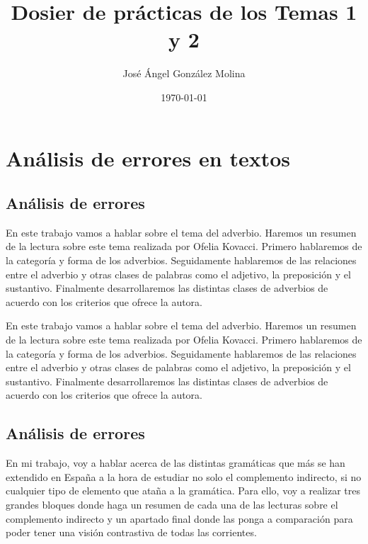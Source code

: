 \documentclass[12pt, a4paper, oneside]{report}
\title{Dosier de prácticas de los Temas 1 y 2}
\author{José Ángel González Molina}
\date{\today}
\begin{document}
    \color{negro}
    \maketitle
    \clearpage

    \chapter*{Análisis de errores en textos}
    \setcounter{chapter}{1}
      \section{Análisis de errores}
      En este trabajo vamos a hablar sobre el tema del adverbio. Haremos un resumen de la lectura sobre este
      tema realizada por Ofelia Kovacci. Primero hablaremos de la categoría y forma de los adverbios.
      Seguidamente hablaremos de las relaciones entre el adverbio y otras clases de palabras como el adjetivo,
      la preposición y el sustantivo. Finalmente desarrollaremos las distintas clases de adverbios de acuerdo
      con los criterios que ofrece la autora.



    En este trabajo vamos a hablar %
     sobre el tema del adverbio. Haremos un resumen %
de la lectura sobre este tema realizada por
Ofelia Kovacci. Primero hablaremos de la %
categoría y forma de los adverbios.
Seguidamente %
hablaremos %
de
las
relaciones entre el adverbio y otras clases
de
palabras
como
el
adjetivo,
la
preposición y el sustantivo. Finalmente %
desarrollaremos las distintas clases de
adverbios de acuerdo con los criterios que
ofrece la autora.

\section{Análisis de errores}

En mi trabajo, voy a hablar acerca %
  de las distintas gramáticas que más se han extendido en España %
  a la hora de estudiar
no solo el complemento indirecto, si no %
cualquier tipo de elemento que ataña a la gramática.
Para ello, voy a realizar %
tres grandes bloques %
donde haga un resumen de cada una de las lecturas sobre el
complemento indirecto y un apartado ﬁnal %
donde las ponga a comparación para poder
tener una visión contrastiva de todas las
corrientes.
\end{document}
